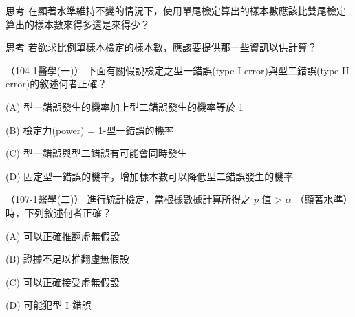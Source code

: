     \bigskip

    \begin{custom}{思考}
        在顯著水準維持不變的情況下，使用單尾檢定算出的樣本數應該比雙尾檢定算出的樣本數來得多還是來得少？
    \end{custom}

    \bigskip

    \begin{custom}{思考}
        若欲求比例單樣本檢定的樣本數，應該要提供那一些資訊以供計算？
    \end{custom}
    
    \begin{docexam}{（104-1醫學(一)）}
        下面有關假說檢定之型一錯誤(type I error)與型二錯誤(type II error)的敘述何者正確？

        (A) 型一錯誤發生的機率加上型二錯誤發生的機率等於 1

        (B) 檢定力(power) = 1-型一錯誤的機率

        (C) 型一錯誤與型二錯誤有可能會同時發生

        (D) 固定型一錯誤的機率，增加樣本數可以降低型二錯誤發生的機率
    \end{docexam}
    
    \begin{docexam}{（107-1醫學(二)）}
        進行統計檢定，當根據數據計算所得之 $p$ 值 > $\alpha$ （顯著水準）時，下列敘述何者正確？

        (A) 可以正確推翻虛無假設

        (B) 證據不足以推翻虛無假設

        (C) 可以正確接受虛無假設

        (D) 可能犯型 I 錯誤
    \end{docexam}

    




    
